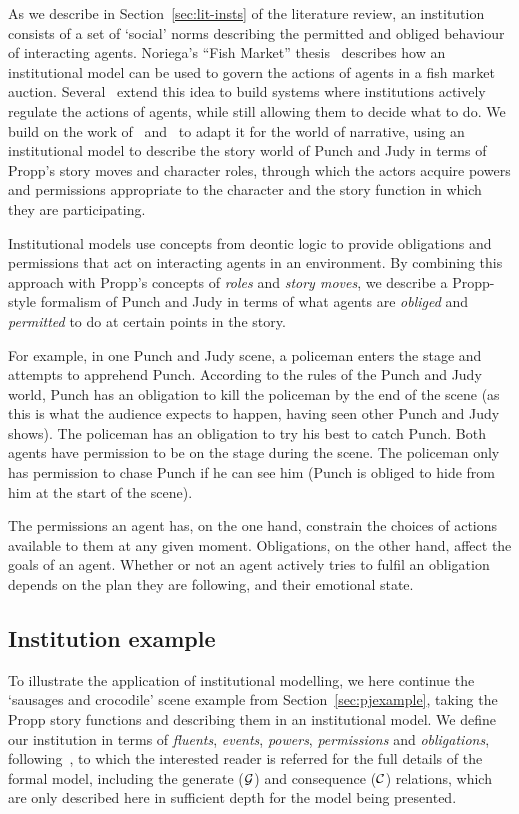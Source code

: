 \documentclass[11pt]{report}
\begin{document}
As we describe in Section~\ref{sec:lit-insts} of the literature review, an institution consists of a set of `social' norms describing the permitted and obliged behaviour of interacting agents. Noriega's ``Fish Market'' thesis~\citep{noriega1999agent} describes how an institutional model can be used to govern the actions of agents in a fish market auction. Several~\citep{artikis2009specifying,fornara2007agent,cardoso2007institutional} extend this idea to build systems where institutions actively regulate the actions of agents, while still allowing them to decide what to do. We build on the work of~\citet{cliffe2007specifying} and~\citet{lee2013decoupling} to adapt it for the world of narrative, using an institutional model to describe the story world of Punch and Judy in terms of Propp's story moves and character roles, through which the actors acquire powers and permissions appropriate to the character and the story function in which they are participating.

Institutional models use concepts from deontic logic to provide obligations and permissions that act on interacting agents in an environment. By combining this approach with Propp's concepts of \emph{roles} and \emph{story moves}, we describe a Propp-style formalism of Punch and Judy in terms of what agents are \emph{obliged} and \emph{permitted} to do at certain points in the story.

For example, in one Punch and Judy scene, a policeman enters the stage and attempts to apprehend Punch. According to the rules of the Punch and Judy world, Punch has an obligation to kill the policeman by the end of the scene (as this is what the audience expects to happen, having seen other Punch and Judy shows). The policeman has an obligation to try his best to catch Punch. Both agents have permission to be on the stage during the scene. The policeman only has permission to chase Punch if he can see him (Punch is obliged to hide from him at the start of the scene).

The permissions an agent has, on the one hand, constrain the choices of actions
available to them at any given moment. Obligations, on the other hand, affect
the goals of an agent. Whether or not an agent actively tries to fulfil an
obligation depends on the plan they are following, and their emotional state.

\subsection{Institution example}
\label{sec:pjexample-insts}
To illustrate the application of institutional modelling, we here continue the `sausages and crocodile' scene example from Section~\ref{sec:pjexample}, taking the Propp story functions and describing them in an institutional model.  We define our institution in terms of \emph{fluents}, \emph{events}, \emph{powers}, \emph{permissions} and \emph{obligations}, following~\citet{cliffe2007specifying}, to which the interested reader is referred for the full details of the formal model, including the generate ($\cal G$) and consequence ($\cal C$) relations, which are only described here in sufficient depth for the model being presented.
\end{document}
